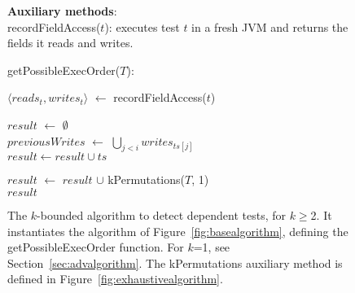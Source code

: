 \begin{figure}[t]
\textbf{Auxiliary methods}:\\
recordFieldAccess($\mathit{t}$): executes test $\mathit{t}$ in
a fresh JVM and returns the fields it reads and writes.\\


\smallsqueeze

getPossibleExecOrder($T$):\\
\bigsqueeze
\begin{algorithmic}[1]
\STATE $\langle \mathit{reads}_t, \mathit{writes}_t\rangle$ $\leftarrow$ recordFieldAccess($\mathit{t}$)\\ 
\ENDFOR

\STATE $\mathit{result}$ $\leftarrow$ $\emptyset$ \\
		\STATE $\mathit{previousWrites}$ $\leftarrow$ $\bigcup_{\mathit{j} < \mathit{i}}  \mathit{writes}_{\mathit{ts}[j]} $ \\
			\STATE $\mathit{result} \leftarrow \mathit{result} \cup \mathit{ts}$
		\ENDIF
	\ENDFOR

\ENDFOR
\STATE $\mathit{result}$ $\leftarrow$ $\mathit{result}$ $\cup$ kPermutations($\mathit{T}$, 1)\\
\RETURN $\mathit{result}$
\end{algorithmic}

\caption {The \dependenceaware{} $k$-bounded algorithm to detect dependent tests,
  for $k$$\ge$2.
It instantiates the algorithm of Figure~\ref{fig:basealgorithm}, defining the
getPossibleExecOrder function.
For $k$=1, see Section~\ref{sec:advalgorithm}.
The kPermutations auxiliary method is defined in Figure~\ref{fig:exhaustivealgorithm}.
} 
\label{fig:impralg}
\end{figure}

